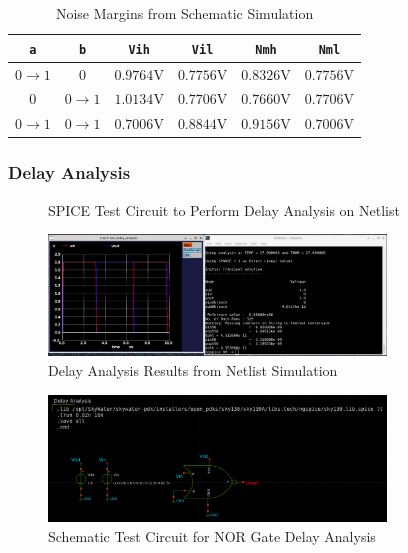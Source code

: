 \documentclass{article}
\begin{document}
	\begin{table}[H]
	\begin{center}
	\caption{Noise Margins from Schematic Simulation}
	\label{table::nor_gate_noise_analysis_schem}
	\begin{tabular}{| c | c | c | c | c | c |}
		\hline
		\texttt{a} & \texttt{b} & \texttt{Vih} & \texttt{Vil} & \texttt{Nmh} & \texttt{Nml} \\
		\hline	
		$0 \rightarrow 1$ & $0$ & $0.9764 \text{V}$ & $0.7756 \text{V}$ & $0.8326 \text{V}$ & $0.7756 \text{V}$\\
		\hline	
		$0$ & $0 \rightarrow 1$ & $1.0134 \text{V}$ & $0.7706 \text{V}$ & $0.7660 \text{V}$ & $0.7706 \text{V}$\\
		\hline	
		$0 \rightarrow 1$ & $0 \rightarrow 1$ & $0.7006 \text{V}$ & $0.8844 \text{V}$ & $0.9156 \text{V}$ & $0.7006 \text{V}$\\
		\hline
	\end{tabular}
	\end{center}
	\end{table}
	
	\subsubsection{Delay Analysis}
	\begin{figure}[H]
		
		\caption{SPICE Test Circuit to Perform Delay Analysis on Netlist}
		\label{fig::nor_delay_analysis_test_circuit}
	\end{figure}
	
	\begin{figure}[H]
		\centerline{\includegraphics[width=0.8\textwidth]{nor_delay_analysis.png}}
		\caption{Delay Analysis Results from Netlist Simulation}
		\label{fig::nor_delay_analysis}
	\end{figure}
	
	\begin{figure}[H]
		\centerline{\includegraphics[width=0.8\textwidth]{nor_delay_analysis_test_circuit.png}}
		\caption{Schematic Test Circuit for NOR Gate Delay Analysis}
		\label{fig::nor_delay_analysis_test_circuit_schem}
	\end{figure}
	
\end{document}
